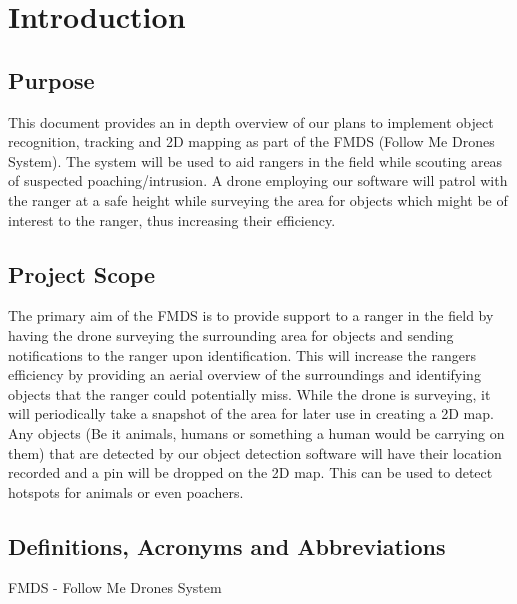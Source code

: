 \chapter{Introduction}

\section{Purpose}
This document provides an in depth overview of our plans to implement object recognition, 
tracking and 2D mapping as part of the FMDS (Follow Me Drones System). 
The system will be used to aid rangers in the field while scouting areas of suspected poaching/intrusion. 
A drone employing our software will patrol with the ranger at a safe height while surveying the area 
for objects which might be of interest to the ranger, thus increasing their efficiency.   

\section{Project Scope}

The primary aim of the FMDS is to provide support to a ranger in the field by having the drone surveying the surrounding area for objects and sending notifications to the ranger upon identification. This will increase 
the rangers efficiency by providing an aerial overview of the surroundings and identifying objects that the 
ranger could potentially miss.
\newline
\newline
While the drone is surveying, it will periodically take a snapshot of the area for later use in creating a 2D map. 
Any objects (Be it animals, humans or something a human would be carrying on them) that are detected by our object detection
software will have their location recorded and a pin will be dropped on the 2D map. This can be used to detect hotspots for
animals or even poachers.

\section{Definitions, Acronyms and Abbreviations}

FMDS - Follow Me Drones System



